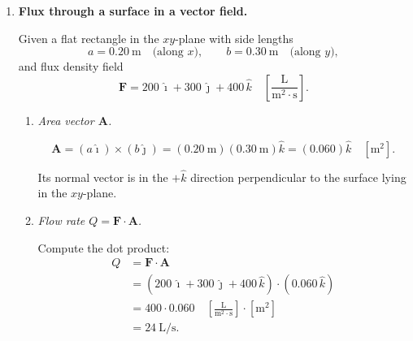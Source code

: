 \documentclass[../main.tex]{subfiles}
\begin{document}
\begin{enumerate}
\begin{enumerate}
    \item \textit{Projection of $\mathbf{a}$ onto $\mathbf{v}$. Physical meaning.}

    The projection of $\mathbf{a}$ onto $\mathbf{v}$ is the component of acceleration along the direction of motion. It measures tangential acceleration (change in speed). Compute
    \[
      \text{proj}_{\mathbf{v}}\mathbf{a}
      = \frac{\mathbf{a}\cdot \mathbf{v}}{\|\mathbf{v}\|^2} \,\mathbf{v}.
    \]

    First compute the dot product:
    \begin{align*}
      \mathbf{a}(t)\cdot \mathbf{v}(t)
      &= (-a\cos t)(-a\sin t) + (-a\sin t)(a\cos t) + (0)(c) \\
      &= a^2 \cos t \sin t - a^2 \sin t \cos t \\
      &= 0.
    \end{align*}

    Therefore
    \[
      \text{proj}_{\mathbf{v}}\mathbf{a} = \mathbf{0}.
    \]

    Interpretation: there is no acceleration component along the velocity direction, so the speed is constant. The acceleration is purely normal (centripetal), changing only the direction of the velocity, not its magnitude.
\end{enumerate}


\item \textbf{Flux through a surface in a vector field.}

Given a flat rectangle in the $xy$-plane with side lengths
\[
a = 0.20~\mathrm{m} \quad \text{(along $x$)}, \qquad
b = 0.30~\mathrm{m} \quad \text{(along $y$)},
\]
and flux density field
\[
\mathbf{F} = 200\,\hat{\imath} + 300\,\hat{\jmath} + 400\,\hat{k}
\quad
\left[\frac{\mathrm{L}}{\mathrm{m}^2\cdot \mathrm{s}}\right].
\]

\begin{enumerate}
    \item \textit{Area vector $\mathbf{A}$.}


    \[
      \mathbf{A} = (a\hat{\imath})\times(b\hat{\jmath}) = (0.20~\mathrm{m})(0.30~\mathrm{m})\hat{k} = (0.060)\hat{k} \quad [\mathrm{m}^2].
    \]

    Its normal vector is in the $+\hat{k}$ direction perpendicular to the surface lying in the $xy$-plane.
    
    \item \textit{Flow rate $Q = \mathbf{F} \cdot \mathbf{A}$.}

    Compute the dot product:
    \begin{align*}
      Q &= \mathbf{F} \cdot \mathbf{A} \\
        &= (200\,\hat{\imath} + 300\,\hat{\jmath} + 400\,\hat{k}) \cdot (0.060\,\hat{k}) \\
        &= 400 \cdot 0.060 \quad \left[\frac{\mathrm{L}}{\mathrm{m}^2\cdot \mathrm{s}}\right] \cdot [\mathrm{m}^2] \\
        &= 24~\mathrm{L/s}.
    \end{align*}


\end{enumerate}
\end{enumerate}
\end{document}
